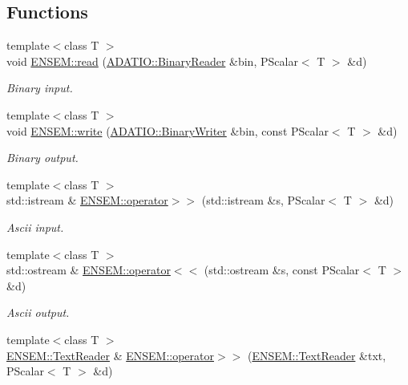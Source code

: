 \subsection*{Functions}
\begin{DoxyCompactItemize}
\item 
{\footnotesize template$<$class T $>$ }\\void \mbox{\hyperlink{group__primscalar_ga1d9173117dec6193e9c26c211973310b}{E\+N\+S\+E\+M\+::read}} (\mbox{\hyperlink{classADATIO_1_1BinaryReader}{A\+D\+A\+T\+I\+O\+::\+Binary\+Reader}} \&bin, P\+Scalar$<$ T $>$ \&d)
\begin{DoxyCompactList}\small\item\em Binary input. \end{DoxyCompactList}\item 
{\footnotesize template$<$class T $>$ }\\void \mbox{\hyperlink{group__primscalar_ga7db0b2a7539f81de4777d87b90de73c6}{E\+N\+S\+E\+M\+::write}} (\mbox{\hyperlink{classADATIO_1_1BinaryWriter}{A\+D\+A\+T\+I\+O\+::\+Binary\+Writer}} \&bin, const P\+Scalar$<$ T $>$ \&d)
\begin{DoxyCompactList}\small\item\em Binary output. \end{DoxyCompactList}\item 
{\footnotesize template$<$class T $>$ }\\std\+::istream \& \mbox{\hyperlink{group__primscalar_gae4d02a7c5e314405b8a8efa45f1f7e62}{E\+N\+S\+E\+M\+::operator$>$$>$}} (std\+::istream \&s, P\+Scalar$<$ T $>$ \&d)
\begin{DoxyCompactList}\small\item\em Ascii input. \end{DoxyCompactList}\item 
{\footnotesize template$<$class T $>$ }\\std\+::ostream \& \mbox{\hyperlink{group__primscalar_ga48eed9feafd51dc2ff5915922fc68275}{E\+N\+S\+E\+M\+::operator$<$$<$}} (std\+::ostream \&s, const P\+Scalar$<$ T $>$ \&d)
\begin{DoxyCompactList}\small\item\em Ascii output. \end{DoxyCompactList}\item 
{\footnotesize template$<$class T $>$ }\\\mbox{\hyperlink{classENSEM_1_1TextReader}{E\+N\+S\+E\+M\+::\+Text\+Reader}} \& \mbox{\hyperlink{group__primscalar_gae6420bec950e94bc85d5f04a7eee20fe}{E\+N\+S\+E\+M\+::operator$>$$>$}} (\mbox{\hyperlink{classENSEM_1_1TextReader}{E\+N\+S\+E\+M\+::\+Text\+Reader}} \&txt, P\+Scalar$<$ T $>$ \&d)

\end{DoxyCompactItemize}

